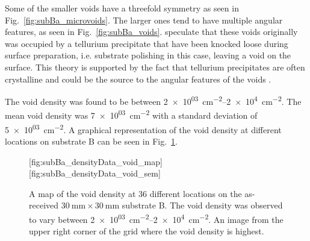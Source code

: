 Some of the smaller voids have a threefold symmetry as seen in Fig.~\ref{fig:subBa_microvoids}. The larger ones tend to have multiple angular features, as seen in Fig.~\ref{fig:subBa_voids}. \citet{reddy2013cross} speculate that these voids originally was occupied by a tellurium precipitate that have been knocked loose during surface preparation, i.e. substrate polishing in this case, leaving a void on the surface. This theory is supported by the fact that tellurium precipitates are often crystalline and could be the source to the angular features of the voids \citep{wang2008observation}.

The void density was found to be between \SIrange{2e+03}{2e+4}{\centi\metre^{-2}}. The mean void density was \SI{7e+03}{\centi\metre^{-2}} with a standard deviation of \SI{5e+03}{\centi\metre^{-2}}. A graphical representation of the void density at different locations on substrate B can be seen in Fig.~\ref{fig:subBa_densityData_voids}.

\begin{figure}[htbp]
    \centering
        [fig:subBa_densityData_void_map]
        \hfill
        [fig:subBa_densityData_void_sem]
    \caption[Map of the void density on the as-received substrate B.]{ A map of the void density at 36 different locations on the as-received $\SI{30}{\milli\metre}\times\SI{30}{\milli\metre}$ substrate B. The void density was observed to vary between \SIrange{2e+03}{2e+4}{\centi\metre^{-2}}.  An image from the upper right corner of the grid where the void density is highest.}
    \label{fig:subBa_densityData_voids}
\end{figure}

